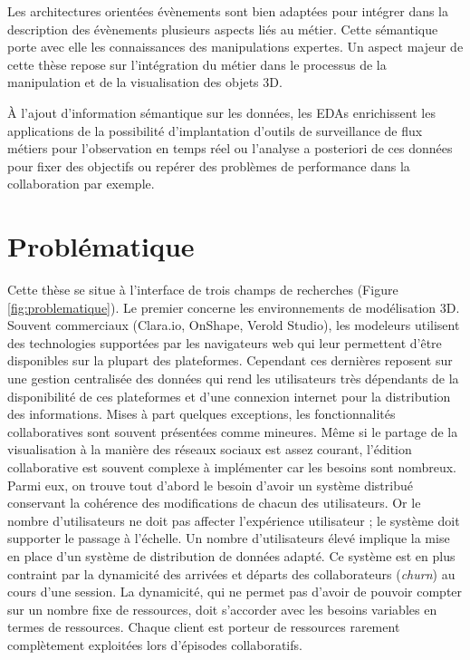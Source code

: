Les architectures orientées 
évènements sont bien adaptées pour intégrer dans la description des 
évènements plusieurs aspects liés au métier. 
Cette sémantique porte avec elle les connaissances des manipulations expertes.
Un aspect majeur de cette thèse repose sur l'intégration du métier dans le 
processus de la manipulation et de la visualisation des objets 3D. 

À l'ajout d'information sémantique sur les données, les \glspl{EDA} enrichissent 
les applications de la possibilité 
d'implantation d'outils de surveillance de flux métiers pour l'observation en temps 
réel ou l'analyse a posteriori de ces données pour fixer des objectifs ou repérer 
des 
problèmes de performance dans la collaboration par exemple.
%
\section{Problématique}


Cette thèse se situe à l'interface de trois champs de recherches (Figure 
\ref{fig:problematique}). Le premier concerne les environnements de modélisation 
3D. Souvent commerciaux (Clara.io, OnShape, Verold Studio), les modeleurs 
utilisent des technologies supportées par les navigateurs web qui leur permettent 
d'être disponibles sur la plupart des plateformes. 
Cependant ces dernières reposent sur une gestion centralisée des données qui rend 
les utilisateurs très dépendants de la disponibilité de ces plateformes et d'une 
connexion internet pour la distribution des informations. 
Mises à part quelques exceptions, les fonctionnalités collaboratives 
sont souvent présentées comme mineures. Même si le \og partage\fg{} de la 
visualisation à la manière des \og réseaux sociaux\fg{} est assez courant, l'édition 
collaborative est souvent complexe à implémenter car les besoins sont nombreux. 
Parmi eux, on trouve tout d'abord le besoin d'avoir un système distribué 
conservant la cohérence des modifications de chacun des utilisateurs. Or 
le nombre d'utilisateurs ne doit pas affecter l'expérience utilisateur ; le système 
doit supporter le passage à l'échelle. 
Un nombre d'utilisateurs élevé implique la mise en place d'un système de 
distribution de données adapté. Ce système est en plus contraint par la dynamicité
des arrivées et départs des collaborateurs (\textit{churn}) au cours d'une session. 
La dynamicité, qui ne permet pas d'avoir de pouvoir compter sur un nombre fixe de 
ressources, doit s'accorder avec les besoins variables en termes de ressources. 
Chaque client est porteur de ressources rarement complètement exploitées lors 
d'épisodes collaboratifs.

